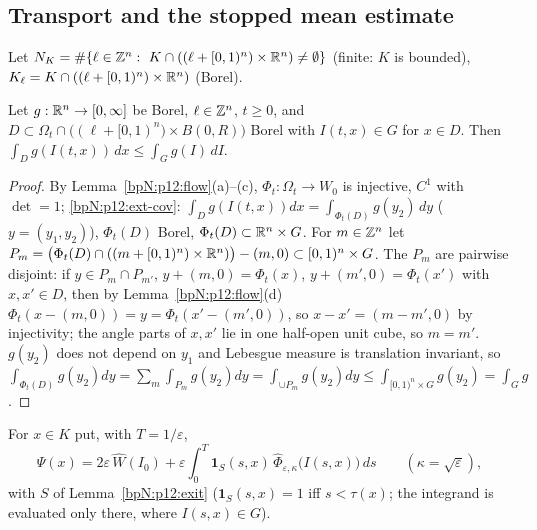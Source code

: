 \subsection{Transport and the stopped mean estimate}\label{bpN:p12:s-trans}

Let $N_K=\#\{\ell\in\Z^n:\ K\cap((\ell+[0,1)^n)\times\R^n)\ne\emptyset\}$ (finite: $K$ is bounded), $K_\ell=K\cap((\ell+[0,1)^n)\times\mathbb{R}^n)$ (Borel).

\begin{lemma}\label{bpN:p12:transport}
Let $g:\mathbb{R}^n\to[0,\infty]$ be Borel, $\ell\in\mathbb{Z}^n$, $t\ge0$, and $D\subset\Omega_t\cap\bigl((\ell+[0,1)^n)\times B(0,R)\bigr)$ Borel with $I(t,x)\in G$ for $x\in D$. Then $\int_D g(I(t,x))\,dx\le\int_Gg(I)\,dI$.
\end{lemma}
\begin{proof}
\label{stepN:p12:tr-cov} By Lemma~\ref{bpN:p12:flow}(a)--(c), $\Phi_t:\Omega_t\to W_0$ is injective, $C^1$ with $\det=1$; \ref{bpN:p12:ext-cov}: $\int_Dg(I(t,x))dx=\int_{\Phi_t(D)}g(y_2)\,dy$ ($y=(y_1,y_2)$), $\Phi_t(D)$ Borel, $\Phi_t(D)\subset\mathbb{R}^n\times G$.
\label{stepN:p12:tr-cells} For $m\in\mathbb{Z}^n$ let $P_m=\bigl(\Phi_t(D)\cap((m+[0,1)^n)\times\mathbb{R}^n)\bigr)-(m,0)\subset[0,1)^n\times G$. The $P_m$ are pairwise disjoint: if $y\in P_m\cap P_{m'}$, $y+(m,0)=\Phi_t(x)$, $y+(m',0)=\Phi_t(x')$ with $x,x'\in D$, then by Lemma~\ref{bpN:p12:flow}(d) $\Phi_t(x-(m,0))=y=\Phi_t(x'-(m',0))$, so $x-x'=(m-m',0)$ by injectivity; the angle parts of $x,x'$ lie in one half-open unit cube, so $m=m'$.
\label{stepN:p12:tr-sum} $g(y_2)$ does not depend on $y_1$ and Lebesgue measure is translation invariant, so $\int_{\Phi_t(D)}g(y_2)dy=\sum_m\int_{P_m}g(y_2)dy=\int_{\cup P_m}g(y_2)dy\le\int_{[0,1)^n\times G}g(y_2)=\int_Gg$.
\end{proof}

For $x\in K$ put, with $T=1/\varepsilon$,
\[\Psi(x)=2\varepsilon\,\widehat W(I_0)+\varepsilon\int_0^T\mathbf 1_S(s,x)\,\widehat\Phi_{\varepsilon,\kappa}\bigl(I(s,x)\bigr)\,ds\qquad(\kappa=\sqrt\varepsilon),\]
with $S$ of Lemma~\ref{bpN:p12:exit} ($\mathbf 1_S(s,x)=1$ iff $s<\tau(x)$; the integrand is evaluated only there, where $I(s,x)\in G$).

